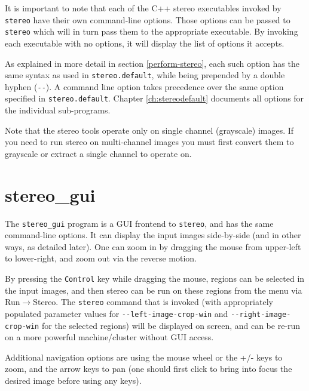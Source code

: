 It is important to note that each of the C++ stereo executables invoked
by \texttt{stereo} have their own command-line options. Those options
can be passed to \texttt{stereo} which will in turn pass them to the
appropriate executable. By invoking each executable with no options, it
will display the list of options it accepts.

As explained in more detail
in section \ref{perform-stereo}, each such option has the same syntax as
used in \texttt{stereo.default}, while being prepended by a double hyphen
(\texttt{-\/-}).  A command line option takes precedence over the same
option specified in \texttt{stereo.default}. Chapter \ref{ch:stereodefault}
documents all options for the individual sub-programs.

Note that the stereo tools operate only on single channel (grayscale) images.
If you need to run stereo on multi-channel images you must first convert them
to grayscale or extract a single channel to operate on.

\section{stereo\_gui}
\label{stereo_gui}

The \texttt{stereo\_gui} program is a GUI frontend to \texttt{stereo},
and has the same command-line options. It can display the input images
side-by-side (and in other ways, as detailed later). One can zoom in by
dragging the mouse from upper-left to lower-right, and zoom out via the
reverse motion.

By pressing the \texttt{Control} key while dragging the mouse, regions
can be selected in the input images, and then stereo can be run on these
regions from the menu via Run$\rightarrow$Stereo. The \texttt{stereo}
command that is invoked (with appropriately populated parameter values
for \texttt{-\/-left-image-crop-win} and \texttt{-\/-right-image-crop-win}
for the selected regions) will
be displayed on screen, and can be re-run on a more powerful
machine/cluster without GUI access.

Additional navigation options are using the mouse wheel or the +/- keys to
zoom, and the arrow keys to pan (one should first click to bring into
focus the desired image before using any keys).

